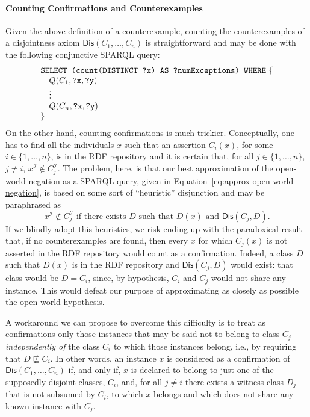\documentclass[a4paper]{article}
\newcounter{ex}
\begin{document}
\paragraph{Counting Confirmations and Counterexamples}

Given the above definition of a counterexample,
counting the counterexamples of a disjointness axiom $\mathsf{Dis}(C_1, \ldots, C_n)$
is straightforward and may be done with the following conjunctive SPARQL query:
\begin{equation}
  \begin{minipage}[c]{5in}
    \begin{tabbing}
      \quad\=\quad\=\quad\=\kill
      \texttt{SELECT (count(DISTINCT ?x) AS ?numExceptions) WHERE} \{\\
      \>$Q(C_1, \mbox{\tt ?x}, \mbox{\tt ?y})$\\
      \>$\vdots$\\
      \>$Q(C_n, \mbox{\tt ?x}, \mbox{\tt ?y})$\\
      \}
    \end{tabbing}
  \end{minipage}
\end{equation}
On the other hand, counting confirmations is much trickier. Conceptually,
one has to find all the individuals $x$ such that an assertion $C_i(x)$, for some
$i \in \{1, \ldots, n\}$, is in the RDF repository and it is certain that,
for all $j\in \{1, \ldots, n\}$, $j \neq i$, $x^\mathcal{I} \notin C_j^\mathcal{I}$.
The problem, here, is that our best approximation of the open-world negation as a SPARQL query,
given in Equation~\ref{eq:approx-open-world-negation},
is based on some sort of ``heuristic'' disjunction and may be paraphrased as
\begin{equation}
  x^\mathcal{I} \notin C_j^\mathcal{I} \mbox{ if there exists $D$ such that }
  D(x) \mbox{ and } \mathsf{Dis}(C_j, D).
\end{equation}
If we blindly adopt this heuristics, we risk ending up with the paradoxical result
that, if no counterexamples are found, then every $x$ for which $C_j(x)$ is not asserted
in the RDF repository would count as a confirmation. Indeed, a class $D$ such that
$D(x)$ is in the RDF repository and $\mathsf{Dis}(C_j, D)$ would exist: that class
would be $D = C_i$, since, by hypothesis, $C_i$ and $C_j$ would not share any instance.
This would defeat our purpose of approximating as closely as possible the open-world hypothesis.

A workaround we can propose to overcome this difficulty is to treat as confirmations
only those instances that may be said not to belong to class $C_j$ \emph{independently of}
the class $C_i$ to which those instances belong, i.e., by requiring that $D \not\sqsubseteq C_i$.
In other words, an instance $x$ is considered as a confirmation of
$\mathsf{Dis}(C_1, \ldots, C_n)$ if, and only if, $x$ is declared to belong to just
one of the supposedly disjoint classes, $C_i$, and, for all $j \neq i$ there exists
a witness class $D_j$ that is not subsumed by $C_i$, to which $x$ belongs and
which does not share any known instance with $C_j$.
\end{document}
